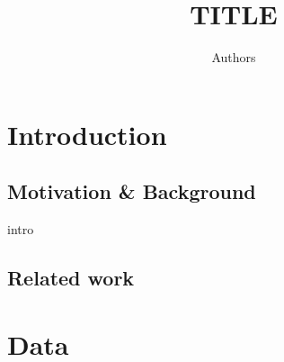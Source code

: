 \documentclass{article}
\title{TITLE}
\author{Authors}
\begin{document}
\maketitle
{}
	

\maketitle

\section{Introduction}
\subsection{Motivation \& Background}
intro
\subsection{Related work}

\section{Data}
\end{document}
